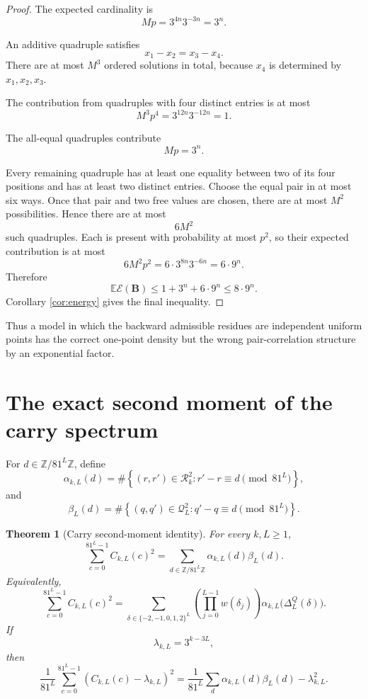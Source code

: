 \documentclass[11pt]{article}
\newtheorem{theorem}{Theorem}[section]
\theoremstyle{remark}
\newcommand{\Z}{\mathbb{Z}}
\newcommand{\Rset}{\mathcal{R}}
\newcommand{\Qset}{\mathcal{Q}}
\newcommand{\Ecal}{\mathcal{E}}
\begin{document}
\begin{proof}
The expected cardinality is
\[
Mp
=
3^{4n}3^{-3n}
=
3^n.
\]

An additive quadruple satisfies
\[
x_1-x_2=x_3-x_4.
\]
There are at most \(M^3\) ordered solutions in total, because \(x_4\) is determined by \(x_1,x_2,x_3\).

The contribution from quadruples with four distinct entries is at most
\[
M^3p^4
=
3^{12n}3^{-12n}
=
1.
\]

The all-equal quadruples contribute
\[
Mp=3^n.
\]

Every remaining quadruple has at least one equality between two of its four positions and has at least two distinct entries.  Choose the equal pair in at most six ways.  Once that pair and two free values are chosen, there are at most \(M^2\) possibilities.  Hence there are at most
\[
6M^2
\]
such quadruples.  Each is present with probability at most \(p^2\), so their expected contribution is at most
\[
6M^2p^2
=
6\cdot3^{8n}3^{-6n}
=
6\cdot9^n.
\]
Therefore
\[
\mathbb E\Ecal(\mathbf B)
\le
1+3^n+6\cdot9^n
\le
8\cdot9^n.
\]
Corollary \ref{cor:energy} gives the final inequality.
\end{proof}

Thus a model in which the backward admissible residues are independent uniform points has the correct one-point density but the wrong pair-correlation structure by an exponential factor.

\section{The exact second moment of the carry spectrum}

For \(d\in\Z/81^L\Z\), define
\[
\alpha_{k,L}(d)
=
\#\left\{
(r,r')\in\Rset_k^2:
r'-r\equiv d\pmod{81^L}
\right\},
\]
and
\[
\beta_L(d)
=
\#\left\{
(q,q')\in\Qset_L^2:
q'-q\equiv d\pmod{81^L}
\right\}.
\]

\begin{theorem}[Carry second-moment identity]
\label{thm:second-moment}
For every \(k,L\ge1\),
\[
\sum_{c=0}^{81^L-1}C_{k,L}(c)^2
=
\sum_{d\in\Z/81^L\Z}
\alpha_{k,L}(d)\beta_L(d).
\]
Equivalently,
\[
\sum_{c=0}^{81^L-1}C_{k,L}(c)^2
=
\sum_{\delta\in\{-2,-1,0,1,2\}^L}
\left(
\prod_{j=0}^{L-1}w(\delta_j)
\right)
\alpha_{k,L}\bigl(\Delta_L^Q(\delta)\bigr).
\]
If
\[
\lambda_{k,L}=3^{k-3L},
\]
then
\[
\frac1{81^L}
\sum_{c=0}^{81^L-1}
\left(C_{k,L}(c)-\lambda_{k,L}\right)^2
=
\frac1{81^L}
\sum_d\alpha_{k,L}(d)\beta_L(d)
-
\lambda_{k,L}^2.
\]
\end{theorem}
\end{document}

